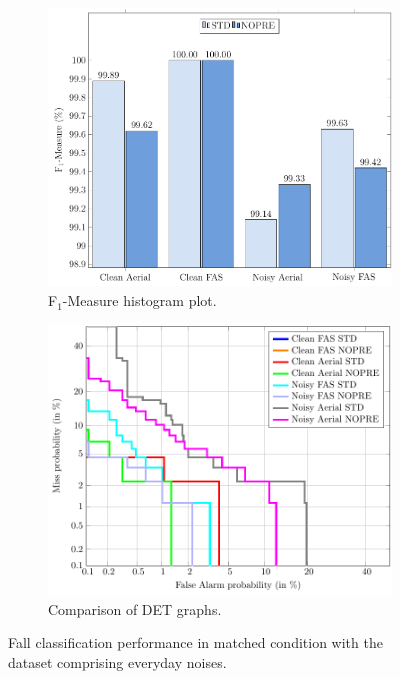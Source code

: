 \begin{figure}[t]
	\centering
	\begin{subfigure}[b]{0.6\textwidth}
		\includegraphics[width=\textwidth]{img/winr2016/pgfsource/8_bck_matched/BAR_8_bck_matched.pdf}
		\caption{F$_1$-Measure histogram plot.}\label{fig:match_bck_BAR}
	\end{subfigure}
	\hspace{5mm}
	\begin{subfigure}[b]{0.6\textwidth}
		\includegraphics[width=\textwidth]{img/winr2016/matlab2tikz/8_bck_matched/DET_8_bck_matched.pdf}
		\caption{ Comparison of DET graphs.}\label{fig:match_bck_DET}
	\end{subfigure}
	\caption{Fall classification performance in matched condition with the dataset comprising everyday noises.}\label{fig:match_bck}

\end{figure}

